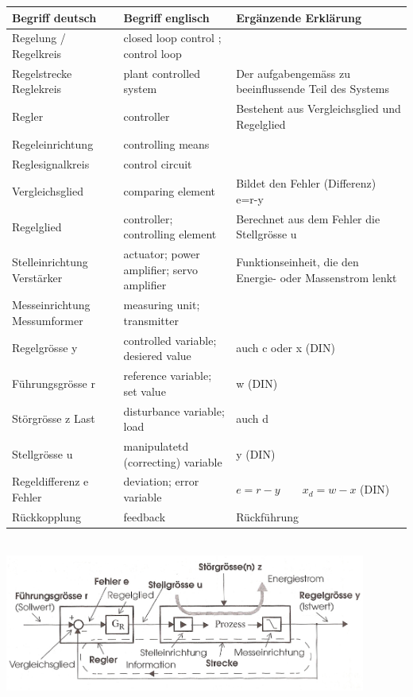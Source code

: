 	\begin{tabular}{|p{2.7cm}|p{5.4cm}|l|}
    	\hline
    	{\bf Begriff deutsch}		&{\bf Begriff englisch}	&{\bf Ergänzende
    	Erklärung} \formelbuch{20}\\
		\hline
		Regelung /
		Regelkreis			& closed loop control ; control loop & \\
		\hline
		Regelstrecke
    	Reglekreis			&plant controlled system	&Der aufgabengemäss zu beeinflussende
    	Teil des Systems\\
    	\hline
    	Regler				&controller			&Bestehent aus Vergleichsglied und Regelglied\\
    	\hline
    	Regeleinrichtung	&controlling means&\\
    	\hline
    	Reglesignalkreis	&control circuit&\\
    	\hline
    	Vergleichsglied		&comparing element	&Bildet den Fehler (Differenz)
    											e=r-y\\
    	\hline
    	Regelglied			&controller;
    						controlling element	&Berechnet aus dem Fehler die Stellgrösse u\\
    	\hline
    	Stelleinrichtung
    	Verstärker			&actuator;
					    	power amplifier;
    						servo amplifier		&Funktionseinheit, die den Energie- oder Massenstrom
    											lenkt\\
    	\hline
    	Messeinrichtung
    	Messumformer		&measuring unit;
    						transmitter&\\
    	\hline
    	Regelgrösse y		&controlled variable;
    						desiered value& auch c oder x (DIN)\\
    	\hline
    	Führungsgrösse r	&reference variable;
    						set value& w (DIN)\\
    	\hline
    	Störgrösse z Last	&disturbance variable;
    						load& auch d\\
    	\hline
    	Stellgrösse u		&manipulatetd (correcting)
    						variable& y (DIN)\\
    	\hline
    	Regeldifferenz e
    	Fehler				&deviation;
    						error variable		&$e=r-y \quad \quad x_d=w-x$ (DIN) \\
    	\hline
    	Rückkopplung		&feedback			&Rückführung\\
    	\hline

	\end{tabular}\\
\includegraphics[height=4.5cm]{./bilder/Grundregelkreis_klein.jpg}


